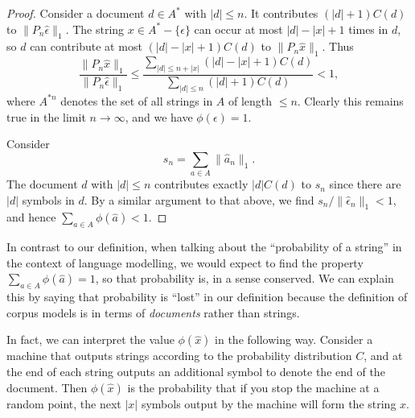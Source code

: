 


\begin{proof}
Consider a document $d \in A^*$ with $|d| \le n$. It contributes $(|d|+1)C(d)$ to $\|P_n\hat{\epsilon}\|_1$. The string $x \in A^* - \{\epsilon\}$ can occur at most $|d| - |x| + 1$ times in $d$, so $d$ can contribute at most $(|d|- |x| + 1)C(d)$ to $\|P_n\hat{x}\|_1$. Thus
$$\frac{\|P_n\hat{x}\|_1}{\|P_n\hat{\epsilon}\|_1} \le \frac{\sum_{|d| \le n + |x|}(|d| - |x| + 1)C(d)}{\sum_{|d| \le n}(|d|+1)C(d)} < 1,$$
where $A^{*n}$ denotes the set of all strings in $A$ of length $\le n$. Clearly this remains true in the limit $n \rightarrow \infty$, and we have $\phi(\epsilon) = 1$.

Consider $$s_n = \sum_{a \in A} \|\hat{a}_n\|_1.$$ The document $d$ with $|d| \le n$ contributes exactly $|d|C(d)$ to $s_n$ since there are $|d|$ symbols in $d$. By a similar argument to that above, we find $s_n/\|\hat{\epsilon}_n\|_1 < 1$, and hence $\sum_{a \in A} \phi(\hat{a}) < 1$.
\end{proof}

In contrast to our definition, when talking about the ``probability of a string'' in the context of language modelling, we would expect to find the property $\sum_{a \in A} \phi(\hat{a}) = 1$, so that probability is, in a sense conserved. We can explain this by saying that probability is ``lost'' in our definition because the definition of corpus models is in terms of \emph{documents} rather than strings. 

In fact, we can interpret the value $\phi(\hat{x})$ in the following way. Consider a machine that outputs strings according to the probability distribution $C$, and at the end of each string outputs an additional symbol to denote the end of the document. Then $\phi(\hat{x})$ is the probability that if you stop the machine at a random point, the next $|x|$ symbols output by the machine will form the string $x$.

